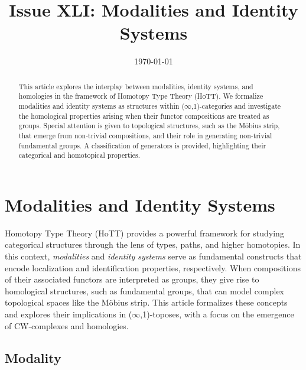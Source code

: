 \documentclass[12pt]{article}
\theoremstyle{definition}
\theoremstyle{plain}
\begin{document}
\title{Issue XLI: Modalities and Identity Systems}
\author{}
\date{\today}

\maketitle

\begin{abstract}
This article explores the interplay between modalities, identity systems, and homologies
in the framework of Homotopy Type Theory (HoTT). We formalize modalities and identity
systems as structures within ($\infty$,1)-categories and investigate the homological properties arising when their functor compositions are treated as groups. Special attention is given to topological structures, such as the Möbius strip, that emerge from non-trivial compositions, and their role in generating non-trivial fundamental groups. A classification of generators is provided, highlighting their categorical and homotopical properties.
\end{abstract}

\section{Modalities and Identity Systems}

Homotopy Type Theory (HoTT) provides a powerful framework for studying
categorical structures through the lens of types, paths, and higher
homotopies. In this context, \emph{modalities} and \emph{identity systems}
serve as fundamental constructs that encode localization and identification
properties, respectively. When compositions of their associated functors
are interpreted as groups, they give rise to homological structures, such
as fundamental groups, that can model complex topological spaces like the
Möbius strip. This article formalizes these concepts and explores their
implications in ($\infty$,1)-toposes, with a focus on the emergence of CW-complexes and homologies.

\newpage
\subsection{Modality}
\end{document}
